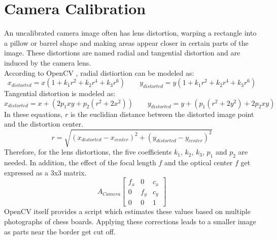 \section{Camera Calibration}
\label{sec:FundCamCalibration}
An uncalibrated camera image often has lens distortion, warping a rectangle into a pillow or barrel shape and making areas appear closer in certain parts of the image. These distortions are named radial and tangential distortion and are induced by the camera lens.\\
According to OpenCV \cite{openCVCamCalib}, radial distiortion can be modeled as:
\begin{equation*}
x_{distorted} = x(1+k_{1}r^{2}+k_{2}r^{4}+k_{3}r^{6})\qquad
y_{distorted} = y(1+k_{1}r^{2}+k_{2}r^{4}+k_{3}r^{6})
\end{equation*}
Tangential distortion is modeled as\cite{openCVCamCalib}:
\begin{equation*}
    x_{distorted} = x+(2p_{1}xy+p_{2}(r^{2}+2x^{2}))\qquad
    y_{distorted} = y+(p_{1}(r^{2}+2y^{2})+2p_{2}xy)
\end{equation*}
In these equations, $r$ is the euclidian distance between the distorted image point and the distortion center.\cite{openCVCamCalib}\\
\begin{equation*}
    r=\sqrt{(x_{distorted}-x_{center})^{2}+(y_{distorted}-y_{center})^{2}}
\end{equation*}
Therefore, for the lens distortions, the five coefficients $k_{1}$, $k_{2}$, $k_{3}$, $p_{1}$ and $p_{2}$ are needed. In addition, the effect of the focal length $f$ and the optical center $f$ get expressed as a 3x3 matrix.\cite{openCVCamCalib}
\begin{equation*}
    A_{Camera}
    \begin{bmatrix}
        f_{x} & 0 & c_{x} \\
        0 & f_{y} & c_{y} \\
        0 & 0 & 1
    \end{bmatrix}
\end{equation*}
OpenCV itself provides a script which estimates these values based on multiple photographs of chess boards. Applying these corrections leads to a smaller image as parts near the border get cut off.
